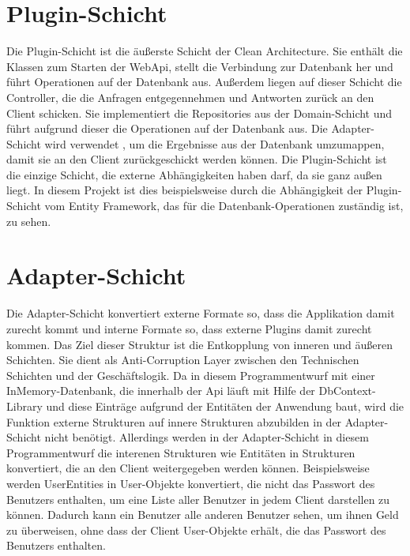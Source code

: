 \section{Plugin-Schicht}
Die Plugin-Schicht ist die äußerste Schicht der Clean Architecture. Sie enthält die Klassen zum Starten der WebApi, stellt die Verbindung zur Datenbank her und führt Operationen auf der Datenbank aus.  
Außerdem liegen auf dieser Schicht die Controller, die die Anfragen entgegennehmen und Antworten zurück an den Client schicken.
\newline Sie implementiert die Repositories aus der Domain-Schicht und führt aufgrund dieser die Operationen auf der Datenbank aus. Die Adapter-Schicht wird verwendet , um die Ergebnisse aus der Datenbank umzumappen, 
damit sie an den Client zurückgeschickt werden können.  
\newline Die Plugin-Schicht ist die einzige Schicht, die externe Abhängigkeiten haben darf, da sie ganz außen liegt. In diesem Projekt ist dies beispielsweise 
durch die Abhängigkeit der Plugin-Schicht vom Entity Framework, das für die Datenbank-Operationen zuständig ist, zu sehen.
\section{Adapter-Schicht}
Die Adapter-Schicht konvertiert externe Formate so, dass die Applikation damit zurecht kommt und interne Formate so, dass externe Plugins damit zurecht kommen. Das Ziel dieser Struktur ist die Entkopplung von inneren und äußeren Schichten. Sie dient als Anti-Corruption Layer 
zwischen den Technischen Schichten und der Geschäftslogik.
\newline Da in diesem Programmentwurf mit einer InMemory-Datenbank, die innerhalb der Api läuft mit Hilfe der DbContext-Library und diese Einträge aufgrund der Entitäten der Anwendung baut, wird die Funktion externe Strukturen auf innere Strukturen abzubilden in der Adapter-Schicht nicht benötigt. 
Allerdings werden in der Adapter-Schicht in diesem Programmentwurf die interenen Strukturen wie Entitäten in Strukturen konvertiert, die an den Client weitergegeben werden können. Beispielsweise werden UserEntities in User-Objekte konvertiert, die nicht das Passwort des Benutzers enthalten, um eine Liste 
aller Benutzer in jedem Client darstellen zu können. Dadurch kann ein Benutzer alle anderen Benutzer sehen, um ihnen Geld zu überweisen, ohne dass der Client User-Objekte erhält, die das Passwort des Benutzers enthalten.
